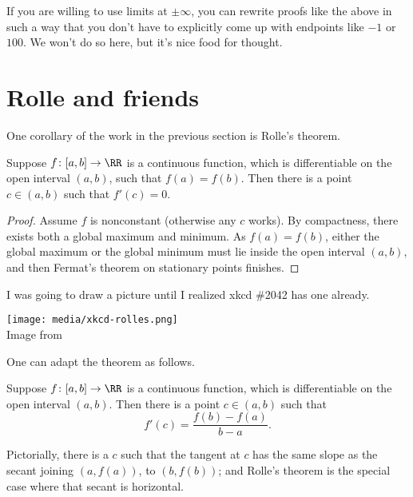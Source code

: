\begin{remark}
	If you are willing to use limits at $\pm \infty$,
	you can rewrite proofs like the above in such a way
	that you don't have to explicitly come up with endpoints like $-1$ or $100$.
	We won't do so here, but it's nice food for thought.
\end{remark}

\section{Rolle and friends}

One corollary of the work in the previous section is Rolle's theorem.
\begin{theorem}
	Suppose $f \colon [a,b] \to \RR$ is a continuous function,
	which is differentiable on the open interval $(a,b)$,
	such that $f(a) = f(b)$.
	Then there is a point $c \in (a,b)$ such that $f'(c) = 0$.
\end{theorem}

\begin{proof}
	Assume $f$ is nonconstant (otherwise any $c$ works).
	By compactness, there exists both a global maximum and minimum.
	As $f(a) = f(b)$, either the global maximum
	or the global minimum must lie inside the open interval $(a,b)$,
	and then Fermat's theorem on stationary points finishes.
\end{proof}

I was going to draw a picture until I realized xkcd \#2042 has one already.
\begin{center}
	\texttt{[image: media/xkcd-rolles.png]}
	\\ \scriptsize Image from \cite{img:xkcd_rolles}
\end{center}

One can adapt the theorem as follows.
\begin{theorem}
	Suppose $f \colon [a,b] \to \RR$ is a continuous function,
	which is differentiable on the open interval $(a,b)$.
	Then there is a point $c \in (a,b)$ such that
	\[ f'(c) = \frac{f(b)-f(a)}{b-a}. \]
\end{theorem}

Pictorially, there is a $c$ such that the tangent at $c$
has the same slope as the secant joining $(a, f(a))$, to $(b, f(b))$;
and Rolle's theorem is the special case where that secant is horizontal.

